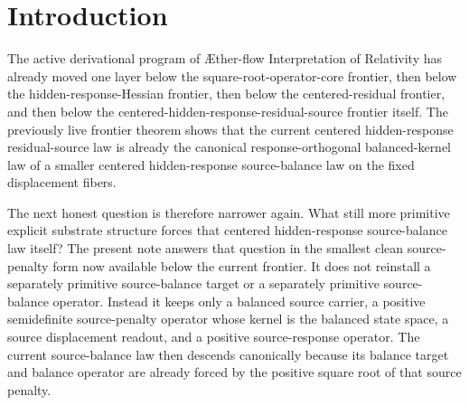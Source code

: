 \documentclass[11pt]{article}
\newcommand{\Aflow}{\AE{}ther-flow}
\newcommand{\TheoryName}{\Aflow{} Interpretation of Relativity}
\newcommand{\CompletedMetric}{g^{\sharp}}
\begin{document}
\begin{abstract}
The benchmark boundary remains unchanged throughout. The one operative metric is still exactly \(\CompletedMetric\), the ordinary matter route is unchanged, there is no second operative metric, the low-energy matter law is not enlarged, and no stronger promotion from adoption to completed first-principles derivation is licensed. Once this smaller source-penalty kernel law is fixed, the same centered hidden-response source-balance law, the same centered hidden-response residual-source law, the same centered hidden-response residual law, the same hidden-response Hessian minimization law, the same square-root operator core, the same section-centered displacement-body quadratic forcing law, the same visible-response operator family, the same canonical minimal visible-response representative, the same current body-response core, and every currently recorded downstream benchmark-facing consequence follow unchanged. The remaining honest burden therefore moves below the separate centered hidden-response source-balance law itself to a deeper derivation or justification of the centered hidden-response source-penalty kernel law that forces it.
\end{abstract}

\section{Introduction}

The active derivational program of \TheoryName{} has already moved one layer below the square-root-operator-core frontier, then below the hidden-response-Hessian frontier, then below the centered-residual frontier, and then below the centered-hidden-response-residual-source frontier itself. The previously live frontier theorem shows that the current centered hidden-response residual-source law is already the canonical response-orthogonal balanced-kernel law of a smaller centered hidden-response source-balance law on the fixed displacement fibers.

The next honest question is therefore narrower again. What still more primitive explicit substrate structure forces that centered hidden-response source-balance law itself? The present note answers that question in the smallest clean source-penalty form now available below the current frontier. It does not reinstall a separately primitive source-balance target or a separately primitive source-balance operator. Instead it keeps only a balanced source carrier, a positive semidefinite source-penalty operator whose kernel is the balanced state space, a source displacement readout, and a positive source-response operator. The current source-balance law then descends canonically because its balance target and balance operator are already forced by the positive square root of that source penalty.
\end{document}
